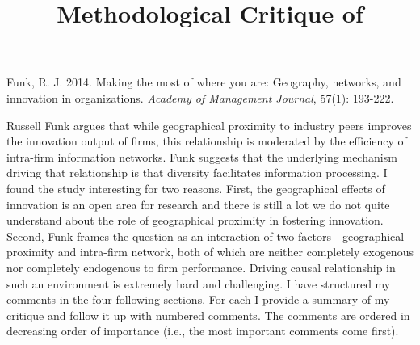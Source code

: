 \documentclass[12pt,letterpaper]{article}
\begin{document}
\title{Methodological Critique of \cite{Funk2014}\vspace{-2cm}}
\date{}
\maketitle

\pagestyle{fancy}
\fancyhf{}
\rhead{\thepage}

Funk, R. J. 2014. Making the most of where you are: Geography, networks, and innovation in organizations. \textit{Academy of Management Journal}, 57(1): 193-222.\vspace{1cm}

Russell Funk argues that while geographical proximity to industry peers improves the innovation output of firms, this relationship is moderated by the efficiency of intra-firm information networks. Funk suggests that the underlying mechanism driving that relationship is that diversity facilitates information processing. I found the study interesting for two reasons. First, the geographical effects of innovation is an open area for research and there is still a lot we do not quite understand about the role of geographical proximity in fostering innovation. Second, Funk frames the question as an interaction of two factors - geographical proximity and intra-firm network, both of which are neither completely exogenous nor completely endogenous to firm performance. Driving causal relationship in such an environment is extremely hard and challenging. I have structured my comments in the four following sections. For each I provide a summary of my critique and follow it up with numbered comments. The comments are ordered in decreasing order of importance (i.e., the most important comments come first).
\end{document}
